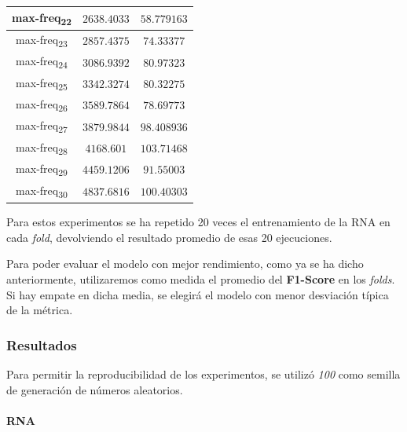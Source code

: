 \documentclass[12pt]{article}
\begin{document}
\begin{table}
\begin{tabular}{||c c c||}
			\hline
			max-freq\textsubscript{22} & $2638.4033$ & $58.779163$ \\
			\hline
			max-freq\textsubscript{23} & $2857.4375$ & $74.33377$ \\
			\hline
			max-freq\textsubscript{24} & $3086.9392$ & $80.97323$ \\
			\hline
			max-freq\textsubscript{25} & $3342.3274$ & $80.32275$ \\
			\hline
			max-freq\textsubscript{26} & $3589.7864$ & $78.69773$ \\
			\hline
			max-freq\textsubscript{27} & $3879.9844$ & $98.408936$ \\
			\hline
			max-freq\textsubscript{28} & $4168.601$ & $103.71468$ \\
			\hline
			max-freq\textsubscript{29} & $4459.1206$ & $91.55003$ \\
			\hline
			max-freq\textsubscript{30} & $4837.6816$ & $100.40303$ \\
			\hline
		\end{tabular}
	\label{Tab:Features_3_4}
\end{table}

\newpage
\hphantom{skip}

Para estos experimentos se ha repetido 20 veces el entrenamiento de la RNA en cada \textit{fold}, devolviendo el resultado promedio de esas 20 ejecuciones.

\bigskip
Para poder evaluar el modelo con mejor rendimiento, como ya se ha dicho anteriormente, utilizaremos como medida el promedio
del \textbf{F1-Score} en los \textit{folds}. Si hay empate en dicha media, se elegirá el modelo con menor
desviación típica de la métrica.

\subsubsection{Resultados}
Para permitir la reproducibilidad de los experimentos, se utilizó \textit{100} como semilla de generación de números
aleatorios.

\paragraph{RNA}
\end{document}
